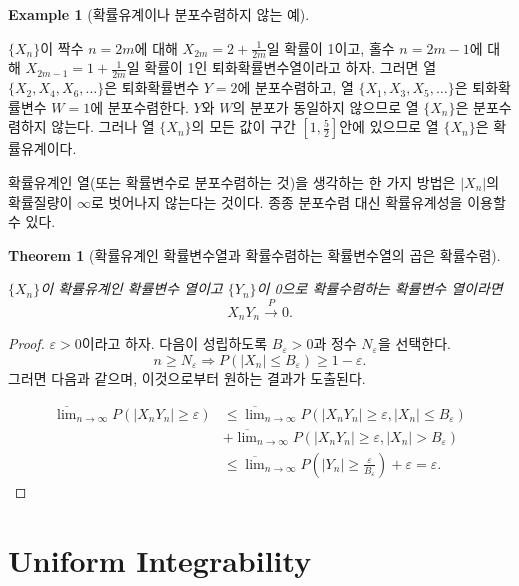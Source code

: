 \documentclass[
  letterpaper,
  DIV=11,
  numbers=noendperiod]{scrreprt}
\theoremstyle{plain}
\newtheorem{theorem}{Theorem}[chapter]
\theoremstyle{definition}
\newtheorem{example}{Example}[chapter]
\theoremstyle{definition}
\theoremstyle{plain}
\theoremstyle{plain}
\theoremstyle{remark}
\begin{document}
\begin{example}[확률유계이나 분포수렴하지 않는
예]\protect\hypertarget{exm-notbpconvd}{}\label{exm-notbpconvd}

\(\{X_n\}\)이 짝수 \(n=2m\)에 대해 \(X_{2m}=2+ \frac{1}{2m}\)일 확률이
1이고, 홀수 \(n=2m-1\)에 대해 \(X_{2m-1}=1+\frac{1}{2m}\)일 확률이 1인
퇴화확률변수열이라고 하자. 그러면 열 \(\{X_2,X_4,X_6,\ldots\}\)은
퇴화확률변수 \(Y=2\)에 분포수렴하고, 열 \(\{X_1,X_3,X_5,\ldots\}\)은
퇴화확률변수 \(W=1\)에 분포수렴한다. \(Y\)와 \(W\)의 분포가 동일하지
않으므로 열 \(\{X_n\}\)은 분포수렴하지 않는다. 그러나 열 \(\{X_n\}\)의
모든 값이 구간 \([1,\frac{5}{2}]\)안에 있으므로 열 \(\{X_n\}\)은
확률유계이다.

\end{example}

확률유계인 열(또는 확률변수로 분포수렴하는 것)을 생각하는 한 가지 방법은
\(|X_n|\)의 확률질량이 \(\infty\)로 벗어나지 않는다는 것이다. 종종
분포수렴 대신 확률유계성을 이용할 수 있다.

\begin{theorem}[확률유계인 확률변수열과 확률수렴하는 확률변수열의 곱은
확률수렴]\protect\hypertarget{thm-bppconvp}{}\label{thm-bppconvp}

\(\{X_n\}\)이 확률유계인 확률변수 열이고 \(\{Y_n\}\)이 0으로
확률수렴하는 확률변수 열이라면 \[
X_n Y_n \stackrel{P}{\rightarrow}0.
\]

\end{theorem}

\begin{proof}
\(\varepsilon>0\)이라고 하자. 다음이 성립하도록 \(B_{\varepsilon}>0\)과
정수 \(N_{\varepsilon}\)을 선택한다. \[
n \geq N_{\varepsilon} \Longrightarrow P(|X_n|\leq B_{\varepsilon}) \geq 1-\varepsilon.
\] 그러면 다음과 같으며, 이것으로부터 원하는 결과가 도출된다.

\begin{align*}
\overline{\lim}_{n\rightarrow\infty}P(|X_nY_n|\geq \varepsilon) &\leq \overline{\lim}_{n\rightarrow\infty}P(|X_nY_n|\geq \varepsilon, |X_n| \leq B_\varepsilon)\\
&+ \overline{\lim}_{n\rightarrow\infty}P(|X_nY_n|\geq \varepsilon, |X_n| > B_\varepsilon)\\
&\leq \overline{\lim}_{n\rightarrow\infty} P(|Y_n|\geq \frac{\varepsilon}{B_\varepsilon}) + \varepsilon = \varepsilon.
\end{align*}
\end{proof}

\section{Uniform Integrability}\label{uniform-integrability}
\end{document}
